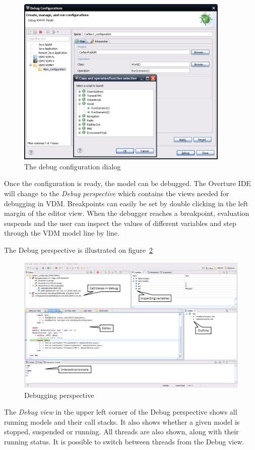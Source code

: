 \begin{figure}[htp]
\begin{center}
  \includegraphics[width=4in]{figures/DebugConfigurationRT}
  \caption{The debug configuration dialog}
  \label{fig:userguide:debugConfiguration}
\end{center}
\end{figure}

Once the configuration is ready, the model can be debugged. The
Overture IDE will change to the \emph{Debug perspective} which
contains the views needed for debugging in VDM. Breakpoints can easily
be set by double clicking in the left margin of the editor view. When
the debugger reaches a breakpoint, evaluation suspends and the user
can inspect the values of different variables and step through the VDM
model line by line.
 
The Debug perspective is illustrated on figure~\ref{fig:userguide:DebuggingVDM}
\begin{figure}[htp]
\begin{center}
  \includegraphics[width=4.5in]{figures/DebuggingVDMRT}
  \caption[Debugging perspective]{Debugging perspective}
  \label{fig:userguide:DebuggingVDM}
\end{center}
\end{figure}
The \emph{Debug view} in the upper left corner of the Debug
perspective shows all running models and their call stacks. It also
shows whether a given model is stopped, suspended or running. All
threads are also shown, along with their running status. It is
possible to switch between threads from the Debug view.

